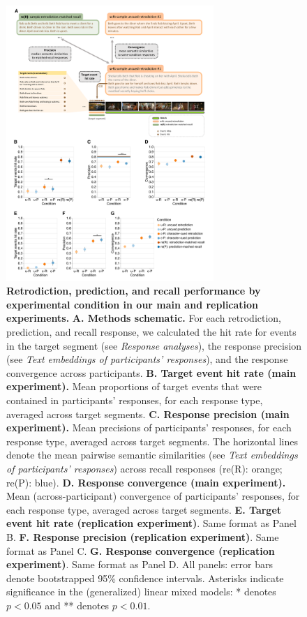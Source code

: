 \documentclass[10pt]{article}
\begin{document}
\begin{figure}[tp]
  \centering
  \includegraphics[width=0.7\textwidth]{results1}

  \caption{\textbf{Retrodiction, prediction, and recall performance by experimental condition in our main and replication experiments.} \textbf{A. Methods schematic.} For each retrodiction, prediction, and recall response, we calculated the hit rate for events in the target segment (see \textit{Response analyses}), the response precision (see \textit{Text embeddings of participants’ responses}), and the response convergence across participants. \textbf{B. Target event hit rate (main experiment).} Mean proportions of target events that were contained in participants' responses, for each response type, averaged across target segments. \textbf{C. Response precision (main experiment).} Mean precisions of participants' responses, for each response type, averaged across target segments. The horizontal lines denote the mean pairwise semantic similarities (see \textit{Text embeddings of participants’ responses}) across recall responses (re(R): orange; re(P): blue). \textbf{D. Response convergence (main experiment).} Mean (across-participant) convergence of participants' responses, for each response type, averaged across target segments. \textbf{E. Target event hit rate (replication experiment)}. Same format as Panel B. 
 \textbf{F. Response precision (replication experiment)}. Same format as Panel C.  \textbf{G. Response convergence (replication experiment)}. Same format as Panel D. All panels: error bars denote bootstrapped 95\% confidence intervals. Asterisks indicate significance in the (generalized) linear mixed models: * denotes $p < 0.05$ and ** denotes $p < 0.01$.}

  \label{fig:result1}
\end{figure}
 
\end{document}
